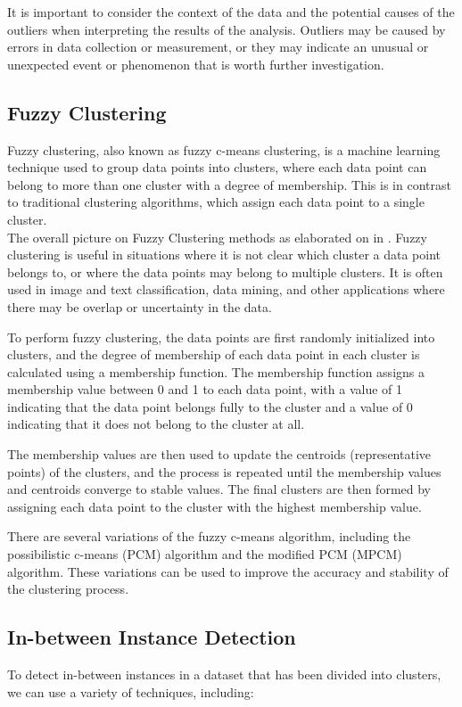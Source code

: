 \documentclass[11pt]{article}
\theoremstyle{definition}
\begin{document}
It is important to consider the context of the data and the potential causes of the outliers when interpreting the results of the analysis. Outliers may be caused by errors in data collection or measurement, or they may indicate an unusual or unexpected event or phenomenon that is worth further investigation.

\subsection{Fuzzy Clustering}
Fuzzy clustering, also known as fuzzy c-means clustering, is a machine learning technique used to group data points into clusters, where each data point can belong to more than one cluster with a degree of membership. This is in contrast to traditional clustering algorithms, which assign each data point to a single cluster.\\
The overall picture on Fuzzy Clustering methods as elaborated on in \cite{grover2014study}.
Fuzzy clustering is useful in situations where it is not clear which cluster a data point belongs to, or where the data points may belong to multiple clusters. It is often used in image and text classification, data mining, and other applications where there may be overlap or uncertainty in the data.

To perform fuzzy clustering, the data points are first randomly initialized into clusters, and the degree of membership of each data point in each cluster is calculated using a membership function. The membership function assigns a membership value between 0 and 1 to each data point, with a value of 1 indicating that the data point belongs fully to the cluster and a value of 0 indicating that it does not belong to the cluster at all.

The membership values are then used to update the centroids (representative points) of the clusters, and the process is repeated until the membership values and centroids converge to stable values. The final clusters are then formed by assigning each data point to the cluster with the highest membership value.

There are several variations of the fuzzy c-means algorithm, including the possibilistic c-means (PCM) algorithm and the modified PCM (MPCM) algorithm. These variations can be used to improve the accuracy and stability of the clustering process.

\subsection{In-between Instance Detection}
To detect in-between instances in a dataset that has been divided into clusters, we can use a variety of techniques, including:
\end{document}
